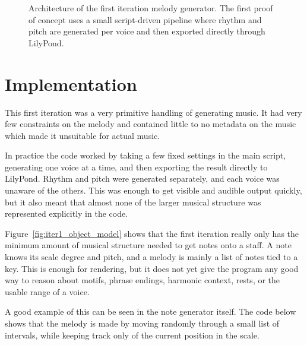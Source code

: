 \begin{figure}[htbp]
{%
    }
    \caption{Architecture of the first iteration melody generator. The first proof of concept uses a small script-driven pipeline where rhythm and pitch are generated per voice and then exported directly through LilyPond.}\label{fig:iter1_architecture}
  \end{figure}

\section{Implementation}
  This first iteration was a very primitive handling of generating music. It had very few constraints on the melody and contained little to no metadata on the music which made it unsuitable for actual music.

  In practice the code worked by taking a few fixed settings in the main script, generating one voice at a time, and then exporting the result directly to LilyPond. Rhythm and pitch were generated separately, and each voice was unaware of the others. This was enough to get visible and audible output quickly, but it also meant that almost none of the larger musical structure was represented explicitly in the code.

  

  Figure~\ref{fig:iter1_object_model} shows that the first iteration really only has the minimum amount of musical structure needed to get notes onto a staff. A note knows its scale degree and pitch, and a melody is mainly a list of notes tied to a key. This is enough for rendering, but it does not yet give the program any good way to reason about motifs, phrase endings, harmonic context, rests, or the usable range of a voice.

  A good example of this can be seen in the note generator itself. The code below shows that the melody is made by moving randomly through a small list of intervals, while keeping track only of the current position in the scale.

